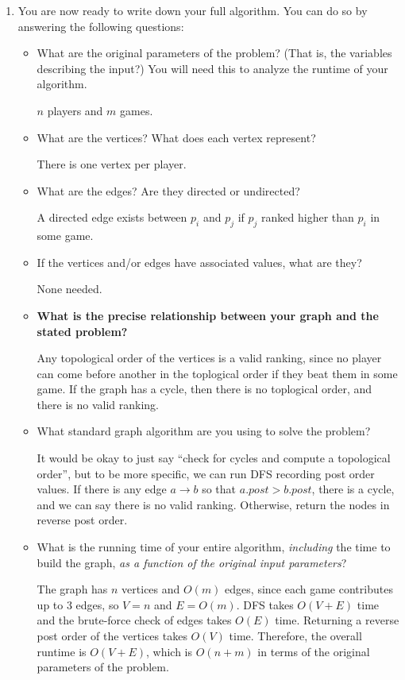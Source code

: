 \documentclass[11pt]{article}
\begin{document}
\begin{enumerate}
    \item You are now ready to write down your full algorithm. You can do so by answering the following questions:
\begin{itemize}
\item What are the original parameters of the problem? (That is, the variables
describing the input?) You will need this to analyze the runtime of your
algorithm.
\begin{Solution}
    $n$ players and $m$ games.
\end{Solution}
\item What are the vertices?  What does each vertex represent?
\begin{Solution}
    There is one vertex per player.
\end{Solution}
\item What are the edges?  Are they directed or undirected?
\begin{Solution}
    A directed edge exists between $p_i$ and $p_j$ if $p_j$ ranked higher than $p_i$
    in some game.
\end{Solution}
\item If the vertices and/or edges have associated values, what are they?
\begin{Solution}
    None needed.
\end{Solution}
\item \textbf{What is the precise relationship between your graph and the stated problem?}
\begin{Solution}
Any topological order of the vertices is a valid ranking, since no
player can come before another in the toplogical order if they beat them
in some game. If the graph has a cycle, then there is no toplogical order,
and there is no valid ranking.
\end{Solution}
\item What standard graph algorithm are you using to solve the problem?
\begin{Solution}
It would be okay to just say ``check for cycles and compute a topological order'',
but to be more specific,
we can run DFS recording post order values. If there is any edge $a\to b$ so that $a.post > b.post$,
there is a cycle, and we can say there is no valid ranking. Otherwise, return the nodes in reverse
post order.
\end{Solution}
\item What is the running time of your entire algorithm, \emph{including} the time to build the graph, \emph{as a function of the original input parameters}?
\begin{Solution}
    The graph has $n$ vertices and $O(m)$ edges, since
    each game contributes up to 3 edges, so $V=n$ and $E=O(m)$. DFS takes $O(V+E)$
    time and the brute-force check of edges takes $O(E)$ time. Returning a reverse
    post order of the vertices takes $O(V)$ time. Therefore, the overall runtime is
    $O(V+E)$, which is $O(n+m)$ in terms of the original parameters of the problem.
\end{Solution}
\end{itemize}
\end{enumerate}


\end{document}
